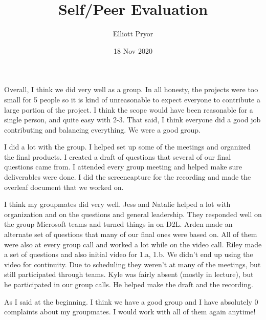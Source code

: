 \documentclass[11pt]{article}
\title{Self/Peer Evaluation}
\author{Elliott Pryor}
\date{18 Nov 2020}
\begin{document}
\maketitle

Overall, I think we did very well as a group. In all honesty, the projects were too small for 5 people so it is kind of unreasonable to expect everyone to contribute a large portion of the project. I think the scope would have been reasonable for a single person, and quite easy with 2-3. That said, I think everyone did a good job contributing and balancing everything. We were a good group.

I did a lot with the group. I helped set up some of the meetings and organized the final products. 
I created a draft of questions that several of our final questions came from. 
I attended every group meeting and helped make sure deliverables were done. I did the screencapture for the recording and made the overleaf document that we worked on. 

I think my groupmates did very well. Jess and Natalie helped a lot with organization and on the questions and general leadership. They responded well on the group Microsoft teams and turned things in on D2L. Arden made an alternate set of questions that many of our final ones were based on. All of them were also at every group call and worked a lot while on the video call. Riley made a set of questions and also initial video for 1.a, 1.b. We didn't end up using the video for continuity. Due to scheduling they weren't at many of the meetings, but still participated through teams. Kyle was fairly absent (mostly in lecture), but he participated in our group calls. He helped make the draft and the recording. 

As I said at the beginning. I think we have a good group and I have absolutely 0 complaints about my groupmates. I would work with all of them again anytime! 
\end{document}
